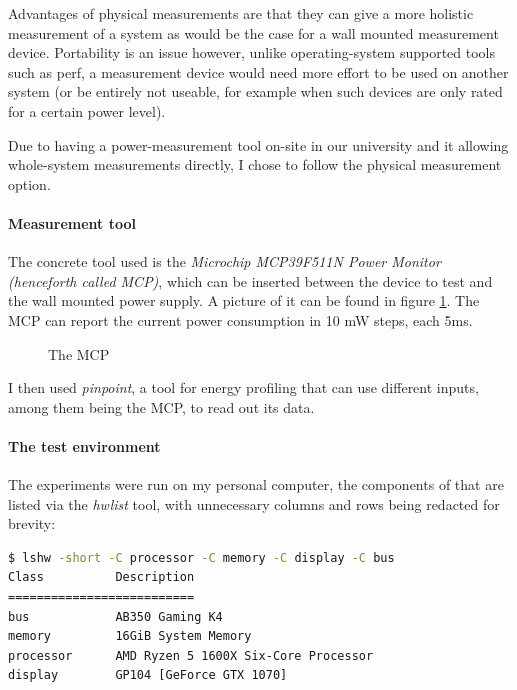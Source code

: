 Advantages of physical measurements are that they can give a more holistic measurement of a system as would be the case for a wall mounted measurement device. Portability is an issue however, unlike operating-system supported tools such as perf, a measurement device would need more effort to be used on another system (or be entirely not useable, for example when such devices are only rated for a certain power level).

Due to having a power-measurement tool on-site in our university and it allowing whole-system measurements directly, I chose to follow the physical measurement option. 

\paragraph{Measurement tool}

The concrete tool used is the \emph{Microchip MCP39F511N Power Monitor (henceforth called MCP)}, which can be inserted between the device to test and the wall mounted power supply. A picture of it can be found in figure \ref{fig:mcp}. The MCP can report the current power consumption in 10 mW steps, each 5ms.

\begin{figure}
    \caption[short]{The MCP}
    \label{fig:mcp}
\end{figure}


I then used \emph{pinpoint}, a tool for energy profiling that can use different inputs, among them being the MCP, to read out its data. 

\paragraph{The test environment}

The experiments were run on my personal computer, the components of that are listed via the \emph{hwlist} tool, with unnecessary columns and rows being redacted for brevity:

\begin{lstlisting}[language=bash, frame=single, numbers=none, caption={Hardware environment of the measurements}, basicstyle=\ttfamily]
   $ lshw -short -C processor -C memory -C display -C bus
Class          Description
==========================
bus            AB350 Gaming K4
memory         16GiB System Memory
processor      AMD Ryzen 5 1600X Six-Core Processor
display        GP104 [GeForce GTX 1070]
\end{lstlisting}

